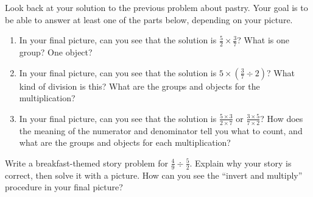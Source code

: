\documentclass[nooutcomes,noauthor]{ximera}
\begin{document}
\newpage

\begin{problem}
Look back at your solution to the previous problem about pastry. Your goal is to be able to answer at least one of the parts below, depending on your picture.
\begin{enumerate}
	\item In your final picture, can you see that the solution is $\frac{5}{2} \times \frac{3}{7}$? What is one group? One object?
	\item In your final picture, can you see that the solution is $5 \times \left ( \frac{3}{7} \div 2 \right )$? What kind of division is this? What are the groups and objects for the multiplication?
	\item In your final picture, can you see that the solution is $\frac{5 \times 3}{2 \times 7}$ or $\frac{3 \times 5}{7 \times 2}$? How does the meaning of the numerator and denominator tell you what to count, and what are the groups and objects for each multiplication?
\end{enumerate}
\end{problem}



\begin{problem}
Write a breakfast-themed story problem for $\frac{4}{9} \div \frac{5}{2}$. Explain why your story is correct, then solve it with a picture. How can you see the ``invert and multiply'' procedure in your final picture?
\end{problem}






\newpage
\end{document}

